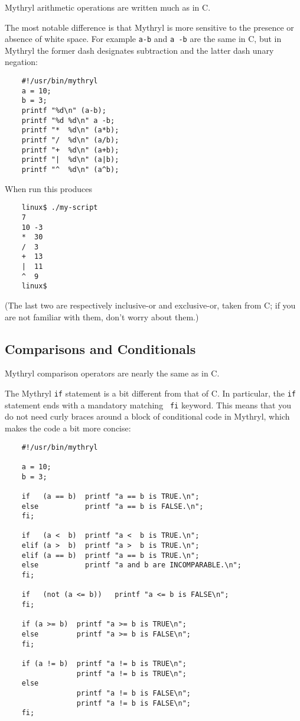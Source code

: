 Mythryl arithmetic operations are written much as in C.

The most notable difference is that Mythryl is more sensitive to the 
presence or absence of white space.  For example {\tt a-b} and {\tt a 
-b} are the same in C, but in Mythryl the former dash designates subtraction 
and the latter dash unary negation:

\begin{verbatim}
    #!/usr/bin/mythryl
    a = 10;
    b = 3;
    printf "%d\n" (a-b);
    printf "%d %d\n" a -b;
    printf "*  %d\n" (a*b);
    printf "/  %d\n" (a/b);
    printf "+  %d\n" (a+b);
    printf "|  %d\n" (a|b);
    printf "^  %d\n" (a^b);
\end{verbatim}

When run this produces

\begin{verbatim}
    linux$ ./my-script
    7
    10 -3
    *  30
    /  3
    +  13
    |  11
    ^  9
    linux$
\end{verbatim}

(The last two are respectively inclusive-or and exclusive-or, taken from 
C;  if you are not familiar with them, don't worry about them.)

\cutend*

\subsection{Comparisons and Conditionals}

Mythryl comparison operators are nearly the same as in C.

The Mythryl {\tt if} statement is a bit different from that of C.  In 
particular, the {\tt if} statement ends with a mandatory matching {\tt 
fi} keyword.  This means that you do not need curly braces around a 
block of conditional code in Mythryl, which makes the code a bit more 
concise:

\begin{verbatim}
    #!/usr/bin/mythryl

    a = 10;
    b = 3;

    if   (a == b)  printf "a == b is TRUE.\n";
    else           printf "a == b is FALSE.\n";
    fi;

    if   (a <  b)  printf "a <  b is TRUE.\n";
    elif (a >  b)  printf "a >  b is TRUE.\n";
    elif (a == b)  printf "a == b is TRUE.\n";
    else           printf "a and b are INCOMPARABLE.\n";
    fi;

    if   (not (a <= b))   printf "a <= b is FALSE\n";
    fi;

    if (a >= b)  printf "a >= b is TRUE\n";
    else         printf "a >= b is FALSE\n";
    fi;

    if (a != b)  printf "a != b is TRUE\n";
                 printf "a != b is TRUE\n";
    else
                 printf "a != b is FALSE\n";
                 printf "a != b is FALSE\n";
    fi;
\end{verbatim}

